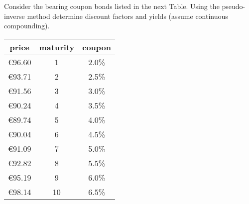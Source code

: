 \begin{question}
Consider the bearing coupon bonds listed in the next Table. Using the pseudo-inverse method determine discount factors and yields (assume continuous compounding).

\begin{table}[htb]
	\begin{center}
		\begin{tabular}{|c|c|c|}
			\hline
			\textbf{price} & \textbf{maturity} & \textbf{coupon} \\
			\hline
			\euro{96.60} & 1 & 2.0\% \\
			\hline
			\euro{93.71} & 2 & 2.5\% \\
			\hline
			\euro{91.56} & 3 & 3.0\% \\
			\hline
			\euro{90.24} & 4 & 3.5\% \\
			\hline
			\euro{89.74} & 5 & 4.0\% \\
			\hline
			\euro{90.04} & 6 & 4.5\% \\
			\hline
			\euro{91.09} & 7 & 5.0\% \\
			\hline
 			\euro{92.82} & 8 & 5.5\% \\
			\hline
			\euro{95.19} & 9 & 6.0\% \\
			\hline
			\euro{98.14} & 10 & 6.5\% \\
			\hline
		\end{tabular}
	\end{center}
\end{table}
	
\end{question}


